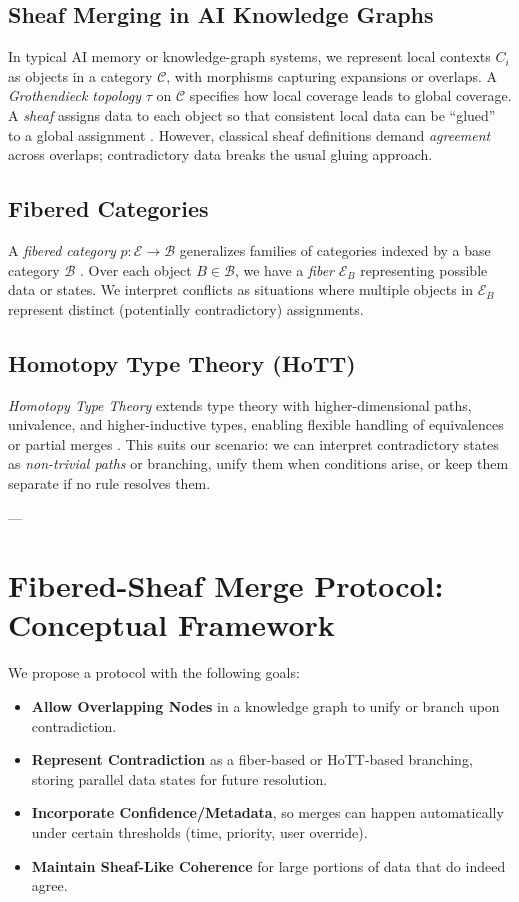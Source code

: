 \documentclass{article}
\begin{document}
\subsection{Sheaf Merging in AI Knowledge Graphs}

In typical AI memory or knowledge-graph systems, we represent local contexts $C_i$ as objects in a category $\mathcal{C}$, with morphisms capturing expansions or overlaps. A \emph{Grothendieck topology} $\tau$ on $\mathcal{C}$ specifies how local coverage leads to global coverage. A \emph{sheaf} assigns data to each object so that consistent local data can be ``glued'' to a global assignment \citep{maclane1971categories, toposMemory2025}. However, classical sheaf definitions demand \emph{agreement} across overlaps; contradictory data breaks the usual gluing approach.

\subsection{Fibered Categories}

A \emph{fibered category} $p: \mathcal{E} \to \mathcal{B}$ generalizes families of categories indexed by a base category $\mathcal{B}$ \citep{grothendieck1971fibre}. Over each object $B \in \mathcal{B}$, we have a \emph{fiber} $\mathcal{E}_B$ representing possible data or states. We interpret conflicts as situations where multiple objects in $\mathcal{E}_B$ represent distinct (potentially contradictory) assignments.

\subsection{Homotopy Type Theory (HoTT)}

\emph{Homotopy Type Theory} extends type theory with higher-dimensional paths, univalence, and higher-inductive types, enabling flexible handling of equivalences or partial merges \citep{hottbook}. This suits our scenario: we can interpret contradictory states as \emph{non-trivial paths} or branching, unify them when conditions arise, or keep them separate if no rule resolves them.

---

\section{Fibered-Sheaf Merge Protocol: Conceptual Framework}
\label{sec:protocol}

We propose a protocol with the following goals:
\begin{itemize}
    \item \textbf{Allow Overlapping Nodes} in a knowledge graph to unify or branch upon contradiction.
    \item \textbf{Represent Contradiction} as a fiber-based or HoTT-based branching, storing parallel data states for future resolution.
    \item \textbf{Incorporate Confidence/Metadata}, so merges can happen automatically under certain thresholds (time, priority, user override).
    \item \textbf{Maintain Sheaf-Like Coherence} for large portions of data that do indeed agree.
\end{itemize}
\end{document}
